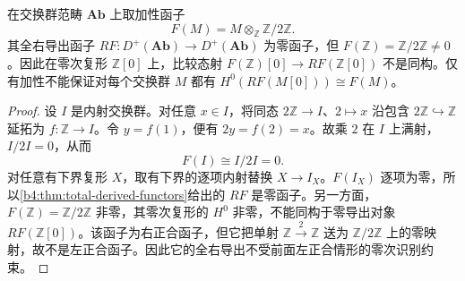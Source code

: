 \begin{proposition}\label{b4:prop:additive-right-derived-zero}
	在交换群范畴 \(\mathbf{Ab}\) 上取加性函子
	\[
		F(M)=M\otimes_{\mathbb Z}\mathbb Z/2\mathbb Z.
	\]
	其全右导出函子 \(RF:D^+(\mathbf{Ab})\to D^+(\mathbf{Ab})\) 为零函子，但 \(F(\mathbb Z)=\mathbb Z/2\mathbb Z\ne0\)。因此在零次复形 \(\mathbb Z[0]\) 上，比较态射 \(F(\mathbb Z)[0]\to RF(\mathbb Z[0])\) 不是同构。仅有加性不能保证对每个交换群 \(M\) 都有 \(H^0(RF(M[0]))\cong F(M)\)。
\end{proposition}
\begin{proof}
	设 \(I\) 是内射交换群。对任意 \(x\in I\)，将同态 \(2\mathbb Z\to I\)、\(2\mapsto x\) 沿包含 \(2\mathbb Z\hookrightarrow\mathbb Z\) 延拓为 \(f:\mathbb Z\to I\)。令 \(y=f(1)\)，便有 \(2y=f(2)=x\)。故乘 \(2\) 在 \(I\) 上满射，\(I/2I=0\)，从而
	\[
		F(I)\cong I/2I=0.
	\]
	对任意有下界复形 \(X\)，取有下界的逐项内射替换 \(X\to I_X\)。\(F(I_X)\) 逐项为零，所以\cref{b4:thm:total-derived-functors}给出的 \(RF\) 是零函子。另一方面，\(F(\mathbb Z)=\mathbb Z/2\mathbb Z\) 非零，其零次复形的 \(H^0\) 非零，不能同构于零导出对象 \(RF(\mathbb Z[0])\)。该函子为右正合函子，但它把单射 \(\mathbb Z\xrightarrow{2}\mathbb Z\) 送为 \(\mathbb Z/2\mathbb Z\) 上的零映射，故不是左正合函子。因此它的全右导出不受前面左正合情形的零次识别约束。
\end{proof}
